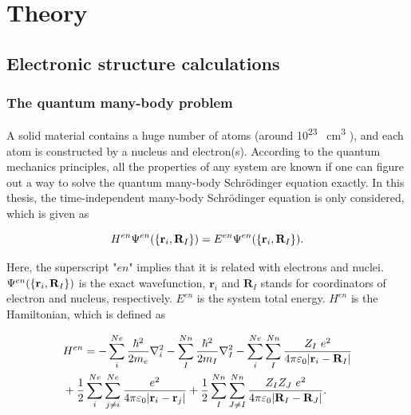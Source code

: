 \documentclass[a4paper, 12pt, titlepage,oneside,drop]{kthesis}
\begin{document}
\chapter{Theory}

\section{Electronic structure calculations }
\label{ch:dft}

\subsection{The quantum many-body problem}
\label{ch:mb}

\noindent A solid material contains a huge number of atoms (around 10\textsuperscript{23} \si{\per\cubic\centi\metre} ), and each atom is constructed by a nucleus and electron(s). 
According to the quantum mechanics principles, all the properties of any system are known if one can figure out a way to solve 
the quantum many-body Schrödinger equation exactly. In this thesis, the time-independent many-body Schrödinger equation is only considered, which is given as

\begin{equation}\label{ssth}
 H^{en} {\Psi^{en}(\{ {\textbf r}_{i}, {\textbf R}_{I} \})} = {E^{en}} {\Psi^{en}(\{ {\textbf r}_{i}, {\textbf R}_{I} \})}.
\end{equation}


Here, the superscript "$en$" implies that it is related with electrons and nuclei. ${\Psi^{en}(\{ {\textbf r}_{i}, {\textbf R}_{I} \})}$ is the exact wavefunction, $\textbf{r}_{i}$ 
and $\textbf{R}_{I}$  stands for coordinators of electron and nucleus, respectively. $E^{en}$ is the system total energy. $H^{en}$ is the Hamiltonian, which is defined as

\begin{equation}\label{th}
\begin{split}
& H^{en} = - \sum\limits_i^{Ne} {\frac{\hbar^{2}}{2 m_{e}}}   \nablaia<i> - \sum\limits_I^{Nn} {\frac{\hbar^{2}}{2 m_{I}}} \nablaia<I>  - \sum\limits_i^{Ne} \sum\limits_I^{Nn} \frac{Z_{I}\ e^2}{4 \pi \varepsilon_0 |\textbf{r}_{i}-\textbf{R}_{I}|} \\
& + \frac{1}{2} \sum\limits_i^{Ne} \sum\limits_{j \neq i}^{Ne} \frac{ e^2}{4 \pi \varepsilon_0 |\textbf{r}_{i}-\textbf{r}_{j}|} + \frac{1}{2} \sum\limits_I^{Nn} \sum\limits_{J \neq I}^{Nn} \frac{Z_{I} Z_{J}\  e^2}{4 \pi \varepsilon_0 |\textbf{R}_{I}-\textbf{R}_{J}|}.
\end{split}
\end{equation}
\end{document}
